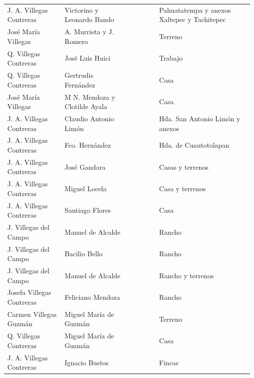 \documentclass[14pt,twoside,final]{extbook} %
\begin{document}
{\begin{longtable}[c]{@{}p{2.5cm}lrSrrl@{}}
J. A. Villegas Contreras & Victorino y Leonardo Bando &  &  &  &  & Pahuatatempa y anexos Xaltepec y Tachitepec \\
José María Villegas & A. Murrieta y J. Romero &  & & & & Terreno \\
Q. Villegas Contreras & José Luis Huici &  & & & & Trabajo \\
Q. Villegas Contreras & Gertrudis Fernández &  &  &  &  & Casa \\
José María Villegas & M N. Mendoza y Clotilde Ayala &  &  &  &  & Casa \\
J. A. Villegas Contreras & Claudio Antonio Limón &  & &  &  & Hda. San Antonio Limón y anexos \\
J. A. Villegas Contreras & Fco. Hernández &  &  &  &  & Hda. de Cuautotolapan \\
J. A. Villegas Contreras & José Gandara &  &  &  &  & Casas y terrenos \\
J. A. Villegas Contreras & Miguel Locela &  &  &  &  & Casa y terrenos \\
J. A. Villegas Contreras & Santiago Flores &  &  &  &  & Casa \\
J. Villegas del Campo & Manuel de Alcalde &  & &  &  & Rancho \\
J. Villegas del Campo & Bacilio Bello &  &  & {} & {} & Rancho \\
J. Villegas del Campo & Manuel de Alcalde &  &  &  &  & Rancho y terrenos \\
Josefa Villegas Contreras & Feliciano Mendoza &  &  & {} & {} & Rancho \\
Carmen Villegas Guzmán & Miguel María de Guzmán &  & {} & {} & {} & Terreno \\
Q. Villegas Contreras & Miguel María de Guzmán &  &  & {} & {} & Casa \\
J. A. Villegas Contreras & Ignacio Bustos &  &  &  &  & Fincas \\

\end{longtable}}
\end{document}
